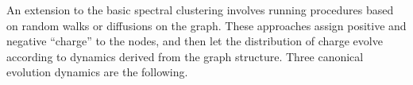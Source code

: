 \documentclass[12pt]{article}
\theoremstyle{plain}
\begin{document}
An extension to the basic spectral clustering 
involves running procedures based on random walks or diffusions 
on the graph.  
These approaches assign positive and negative ``charge'' to the nodes,
and then let the distribution of charge evolve according to dynamics
derived from the graph structure.
Three canonical evolution dynamics are the following.
\end{document}
